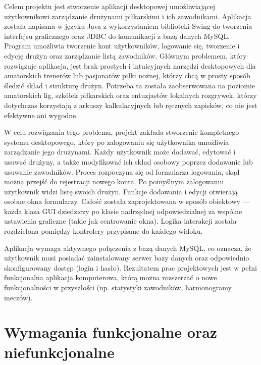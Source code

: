 \documentclass{urdpl}     %
\begin{document}
Celem projektu jest stworzenie aplikacji desktopowej umożliwiającej użytkownikowi zarządzanie drużynami piłkarskimi i ich zawodnikami. Aplikacja została napisana w języku Java z wykorzystaniem biblioteki Swing do tworzenia interfejsu graficznego oraz JDBC do komunikacji z bazą danych MySQL. Program umożliwia tworzenie kont użytkowników, logowanie się, tworzenie i edycję drużyn oraz zarządzanie listą zawodników. Głównym problemem, który rozwiązuje aplikacja, jest brak prostych i intuicyjnych narzędzi desktopowych dla amatorskich trenerów lub pasjonatów piłki nożnej, którzy chcą w prosty sposób śledzić skład i strukturę drużyn. Potrzeba ta została zaobserwowana na poziomie amatorskich lig, szkółek piłkarskich oraz entuzjastów lokalnych rozgrywek, którzy dotychczas korzystają z arkuszy kalkulacyjnych lub ręcznych zapisków, co nie jest efektywne ani wygodne.

W celu rozwiązania tego problemu, projekt zakłada stworzenie kompletnego systemu desktopowego, który po zalogowaniu się użytkownika umożliwia zarządzanie jego drużynami. Każdy użytkownik może dodawać, edytować i usuwać drużyny, a także modyfikować ich skład osobowy poprzez dodawanie lub usuwanie zawodników. Proces rozpoczyna się od formularza logowania, skąd można przejść do rejestracji nowego konta. Po pomyślnym zalogowaniu użytkownik widzi listę swoich drużyn. Funkcje dodawania i edycji otwierają osobne okna formularzy. Całość została zaprojektowana w sposób obiektowy — każda klasa GUI dziedziczy po klasie nadrzędnej odpowiedzialnej za wspólne ustawienia graficzne (takie jak centrowanie okna). Logika interakcji została rozdzielona pomiędzy kontrolery przypisane do każdego widoku.

Aplikacja wymaga aktywnego połączenia z bazą danych MySQL, co oznacza, że użytkownik musi posiadać zainstalowany serwer bazy danych oraz odpowiednio skonfigurowany dostęp (login i hasło). Rezultatem prac projektowych jest w pełni funkcjonalna aplikacja komputerowa, którą można rozszerzać o nowe funkcjonalności w przyszłości (np. statystyki zawodników, harmonogramy meczów).

\section{Wymagania funkcjonalne oraz niefunkcjonalne}
\end{document}
